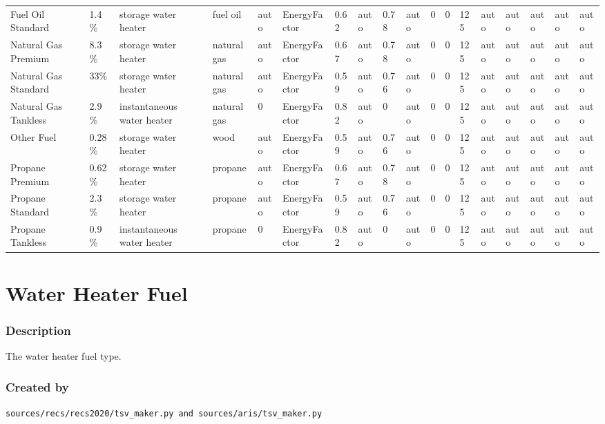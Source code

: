 \begin{longtable}[]{@{}llllllllllllllllll@{}}
Fuel Oil Standard & 1.4\% & storage water heater & fuel oil & auto &
EnergyFactor & 0.62 & auto & 0.78 & auto & 0 & 0 & 125 & auto & auto &
auto & auto & auto \\
Natural Gas Premium & 8.3\% & storage water heater & natural gas & auto
& EnergyFactor & 0.67 & auto & 0.78 & auto & 0 & 0 & 125 & auto & auto &
auto & auto & auto \\
Natural Gas Standard & 33\% & storage water heater & natural gas & auto
& EnergyFactor & 0.59 & auto & 0.76 & auto & 0 & 0 & 125 & auto & auto &
auto & auto & auto \\
Natural Gas Tankless & 2.9\% & instantaneous water heater & natural gas
& 0 & EnergyFactor & 0.82 & auto & 0 & auto & 0 & 0 & 125 & auto & auto
& auto & auto & auto \\
Other Fuel & 0.28\% & storage water heater & wood & auto & EnergyFactor
& 0.59 & auto & 0.76 & auto & 0 & 0 & 125 & auto & auto & auto & auto &
auto \\
Propane Premium & 0.62\% & storage water heater & propane & auto &
EnergyFactor & 0.67 & auto & 0.78 & auto & 0 & 0 & 125 & auto & auto &
auto & auto & auto \\
Propane Standard & 2.3\% & storage water heater & propane & auto &
EnergyFactor & 0.59 & auto & 0.76 & auto & 0 & 0 & 125 & auto & auto &
auto & auto & auto \\
Propane Tankless & 0.9\% & instantaneous water heater & propane & 0 &
EnergyFactor & 0.82 & auto & 0 & auto & 0 & 0 & 125 & auto & auto & auto
& auto & auto \\
\end{longtable}

\section{Water Heater Fuel}\label{water_heater_fuel}

\subsubsection{Description}\label{description-146}

The water heater fuel type.

\subsubsection{Created by}\label{created-by-147}

\texttt{sources/recs/recs2020/tsv\_maker.py\ and\ sources/aris/tsv\_maker.py}

